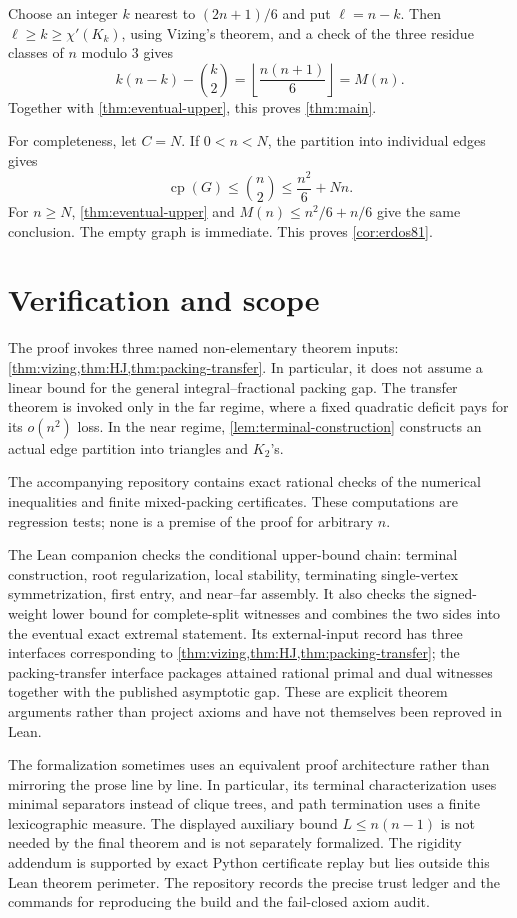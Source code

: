\documentclass[11pt,reqno]{amsart}
\numberwithin{equation}{section}
\theoremstyle{definition}
\theoremstyle{remark}
\newcommand{\cp}{\operatorname{cp}}
\begin{document}
Choose an integer $k$ nearest to $(2n+1)/6$ and put $\ell=n-k$.  Then
$\ell\geq k\geq\chi'(K_k)$, using Vizing's theorem, and a check of the three
residue classes of $n$ modulo $3$ gives
\begin{equation}\label{eq:integer-maximization}
  k(n-k)-\binom k2
  =\left\lfloor\frac{n(n+1)}6\right\rfloor=M(n).
\end{equation}
Together with \cref{thm:eventual-upper}, this proves
\cref{thm:main}.

For completeness, let $C=N$.  If $0<n<N$, the partition into individual
edges gives
\[
  \cp(G)\leq\binom n2\leq\frac{n^2}{6}+Nn.
\]
For $n\geq N$, \cref{thm:eventual-upper} and
$M(n)\leq n^2/6+n/6$ give the same conclusion.  The empty graph is immediate.
This proves \cref{cor:erdos81}.

\section{Verification and scope}

The proof invokes three named non-elementary theorem inputs:
\cref{thm:vizing,thm:HJ,thm:packing-transfer}.  In particular, it does not
assume a linear bound for the general integral--fractional packing gap.  The
transfer theorem is invoked only in the far regime, where a fixed quadratic
deficit pays for its $o(n^2)$ loss.  In the near regime,
\cref{lem:terminal-construction} constructs an actual edge partition into
triangles and $K_2$'s.

The accompanying repository contains exact rational checks of the numerical
inequalities and finite mixed-packing certificates.  These computations are
regression tests; none is a premise of the proof for arbitrary $n$.

The Lean companion checks the conditional upper-bound chain: terminal
construction, root regularization, local stability, terminating
single-vertex symmetrization, first entry, and near--far assembly.  It also
checks the signed-weight lower bound for complete-split witnesses and combines
the two sides into the eventual exact extremal statement.  Its external-input
record has three interfaces corresponding to
\cref{thm:vizing,thm:HJ,thm:packing-transfer}; the packing-transfer interface
packages attained rational primal and dual witnesses together with the
published asymptotic gap.  These are explicit theorem arguments rather than
project axioms and have not themselves been reproved in Lean.

The formalization sometimes uses an equivalent proof architecture rather
than mirroring the prose line by line.  In particular, its terminal
characterization uses minimal separators instead of clique trees, and path
termination uses a finite lexicographic measure.  The displayed auxiliary
bound $L\leq n(n-1)$ is not needed by the final theorem and is not separately
formalized.  The rigidity addendum is supported by exact Python certificate
replay but lies outside this Lean theorem perimeter.  The repository records
the precise trust ledger and the commands for reproducing the build and the
fail-closed axiom audit.



\end{document}
